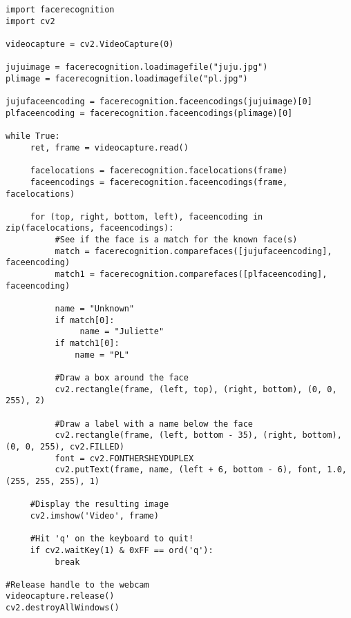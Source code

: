 \begin{verbatim}
import facerecognition
import cv2

videocapture = cv2.VideoCapture(0)

jujuimage = facerecognition.loadimagefile("juju.jpg")
plimage = facerecognition.loadimagefile("pl.jpg")

jujufaceencoding = facerecognition.faceencodings(jujuimage)[0]
plfaceencoding = facerecognition.faceencodings(plimage)[0]

while True:
     ret, frame = videocapture.read()

     facelocations = facerecognition.facelocations(frame)
     faceencodings = facerecognition.faceencodings(frame, facelocations)

     for (top, right, bottom, left), faceencoding in zip(facelocations, faceencodings):
          #See if the face is a match for the known face(s)
          match = facerecognition.comparefaces([jujufaceencoding], faceencoding)
          match1 = facerecognition.comparefaces([plfaceencoding], faceencoding)

          name = "Unknown"
          if match[0]:
               name = "Juliette"
          if match1[0]:
              name = "PL"

          #Draw a box around the face
          cv2.rectangle(frame, (left, top), (right, bottom), (0, 0, 255), 2)

          #Draw a label with a name below the face
          cv2.rectangle(frame, (left, bottom - 35), (right, bottom), (0, 0, 255), cv2.FILLED)
          font = cv2.FONTHERSHEYDUPLEX
          cv2.putText(frame, name, (left + 6, bottom - 6), font, 1.0, (255, 255, 255), 1)

     #Display the resulting image
     cv2.imshow('Video', frame)

     #Hit 'q' on the keyboard to quit!
     if cv2.waitKey(1) & 0xFF == ord('q'):
          break

#Release handle to the webcam
videocapture.release()
cv2.destroyAllWindows()
\end{verbatim}
